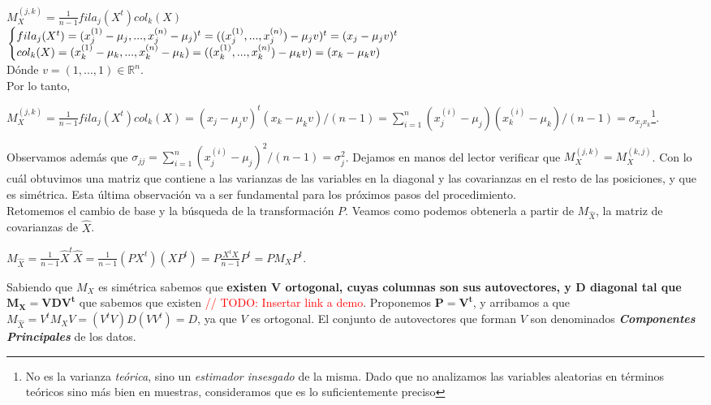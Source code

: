 $M_{X}^{(j,k)} = \frac{1}{n - 1}fila_{j}(X^t)col_{k}(X)$ \\

$\Bigg\{
\begin{array}{@{}ll@{}}
	fila_{j}(X^t) = (x^{(1)}_{j} - \mu_{j}, ..., x^{(n)}_{j} - \mu_{j})^t = ((x^{(1)}_{j}, ..., x^{(n)}_{j}) - \mu_{j}v)^{t} = (x_{j} - \mu_{j}v)^{t} \\
	col_{k}(X) = (x^{(1)}_{k} - \mu_{k}, ..., x^{(n)}_{k} - \mu_{k}) = ((x^{(1)}_{k}, ..., x^{(n)}_{k}) - \mu_{k}v) = (x_{k} - \mu_{k}v)
\end{array}$ \\

D\'onde $v = (1, ..., 1) \in \mathbb{R}^{n}$. \\

Por lo tanto,

$M_{X}^{(j,k)} = \frac{1}{n - 1}fila_{j}(X^t)col_{k}(X) = (x_{j} - \mu_{j}v)^{t}(x_{k} - \mu_{k}v) / (n - 1) = \sum\limits_{i = 1}^{n}(x^{(i)}_{j} - \mu_{j})(x^{(i)}_{k} - \mu_{k}) / (n - 1) = \sigma_{x_{j}x_{k}}$\footnote{No es la varianza \textit{te\'orica}, sino un \textit{estimador insesgado} de la misma. Dado que no analizamos las variables aleatorias en t\'erminos te\'oricos sino m\'as bien en muestras, consideramos que es lo suficientemente preciso}.

Observamos adem\'as que $\sigma_{jj} = \sum\limits_{i = 1}^{n}(x_{j}^{(i)} - \mu_{j})^{2} / (n - 1) = \sigma_{j}^{2}$. Dejamos en manos del lector verificar que $M_{X}^{(j,k)} = M_{X}^{(k,j)}$. Con lo cu\'al obtuvimos una matriz que contiene a las varianzas de las variables en la diagonal y las covarianzas en el resto de las posiciones, y que es sim\'etrica. Esta \'ultima observaci\'on va a ser fundamental para los pr\'oximos pasos del procedimiento. \\

Retomemos el cambio de base y la b\'usqueda de la transformaci\'on $P$. Veamos como podemos obtenerla a partir de $M_{\hat{X}}$, la matriz de covarianzas de $\hat{X}$.

$M_{\hat{X}} = \frac{1}{n - 1}\hat{X}^{t}\hat{X} = \frac{1}{n - 1}(PX^{t})(XP^{t}) = P\frac{X^{t}X}{n - 1}P^{t} = PM_{X}P^{t}$.

Sabiendo que $M_{X}$ es sim\'etrica sabemos que \textbf{existen $\mathbf{V}$ ortogonal, cuyas columnas son sus autovectores, y $\mathbf{D}$ diagonal tal que $\mathbf{M_{X} = VDV^{t}}$} que sabemos que existen \textcolor{red}{// TODO: Insertar link a demo}. Proponemos $\mathbf{P = V^{t}}$, y arribamos a que $M_{\hat{X}} = V^{t}M_{X}V = (V^{t}V)D(VV^{t}) = D$, ya que $V$ es ortogonal. El conjunto de autovectores que forman $V$ son denominados \textbf{\textit{Componentes Principales}} de los datos.


